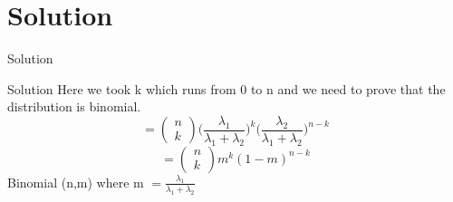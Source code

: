 \documentclass{beamer}
\begin{document}
\section{Solution}
\begin{frame}{Solution}
\begin{block}{Solution}
Here we took k which runs from 0 to n and we need to prove that the distribution is binomial.
$$
=
\begin{pmatrix}
n\\
k
\end{pmatrix}
\Big(\frac{\lambda_1}{\lambda_1+\lambda_2}\Big)^k \Big(\frac{\lambda_2}{\lambda_1+\lambda_2}\Big)^{n-k}
$$
$$
= 
\begin{pmatrix}
n\\
k
\end{pmatrix}
m^k(1-m)^{n-k}
$$
Binomial (n,m) where m
$
 = \frac{\lambda_1}{\lambda_1+\lambda_2}
$
\end{block}
\end{frame}
\end{document}
